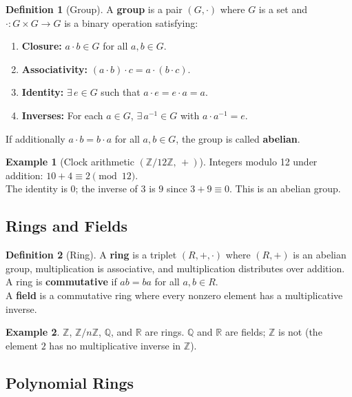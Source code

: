 \documentclass[12pt, a4paper]{article}
\theoremstyle{definition}
\newtheorem{definition}{Definition}[section]
\newtheorem{example}{Example}[section]
\theoremstyle{plain}
\newcommand{\Z}{\mathbb{Z}}
\begin{document}
\begin{definition}[Group]
    A \textbf{group} is a pair $(G, \cdot)$ where $G$ is a set and
    $\cdot : G \times G \to G$ is a binary operation satisfying:
    \begin{enumerate}
        \item \textbf{Closure:} $a \cdot b \in G$ for all $a, b \in G$.
        \item \textbf{Associativity:} $(a \cdot b) \cdot c = a \cdot (b \cdot c)$.
        \item \textbf{Identity:} $\exists\, e \in G$ such that $a \cdot e = e \cdot a = a$.
        \item \textbf{Inverses:} For each $a \in G$, $\exists\, a^{-1} \in G$
              with $a \cdot a^{-1} = e$.
    \end{enumerate}
    If additionally $a \cdot b = b \cdot a$ for all $a, b \in G$, the group is
    called \textbf{abelian}.
\end{definition}

\begin{example}[Clock arithmetic $(\Z/12\Z,\, +)$]
    Integers modulo 12 under addition: $10 + 4 \equiv 2 \pmod{12}$.\\
    The identity is $0$; the inverse of $3$ is $9$ since $3 + 9 \equiv 0$.
    This is an abelian group.
\end{example}

\subsection{Rings and Fields}

\begin{definition}[Ring]
    A \textbf{ring} is a triplet $(R, +, \cdot)$ where $(R, +)$ is an abelian group, multiplication is associative, and multiplication distributes over addition. A ring is \textbf{commutative} if $ab = ba$ for all $a, b \in R$.\\
    
    A \textbf{field} is a commutative ring where every nonzero element has a multiplicative inverse.
\end{definition}

\begin{example}
    $\Z$, $\Z/n\Z$, $\mathbb{Q}$, and $\mathbb{R}$ are rings. $\mathbb{Q}$ and $\mathbb{R}$ are fields; $\Z$ is not (the element $2$ has no multiplicative inverse in $\Z$).
\end{example}

\subsection{Polynomial Rings}
\end{document}

